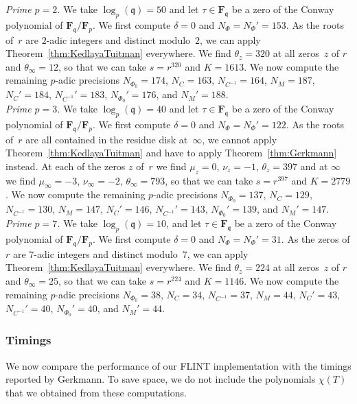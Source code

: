 \documentclass[a4paper,11pt]{article}
\numberwithin{equation}{section}
\newcommand{\FF}{\mathbf{F}} %
\theoremstyle{definition}
\begin{document}
\noindent
\textit{Prime $p=2$.} 
We take $\log_p(\mathfrak{q})=50$ and let $\tau \in \FF_{\mathfrak{q}}$ be 
a zero of the Conway polynomial of $\FF_{\mathfrak{q}}/\FF_p$.  We first 
compute $\delta=0$ and $N_{\Phi}=N_{\Phi}'=153$.  As the roots of~$r$ are 
$2$-adic integers and distinct  modulo~$2$, we can apply 
Theorem~\ref{thm:KedlayaTuitman} everywhere. We find $\theta_z=320$ at all 
zeros~$z$ of $r$ and $\theta_{\infty}=12$, so that we can take $s=r^{320}$ 
and $K=1613$. We now compute the remaining $p$-adic precisions
$N_{\Phi_0}=174$, $N_C=163$, $N_{C^{-1}}=164$, $N_M=187$, 
$N_C'=184$, $N_{C^{-1}}'=183$, $N_{\Phi_0}'=176$, and $N_M'=188$. \\

\noindent 
\textit{Prime $p=3$.}
We take $\log_p(\mathfrak{q})=40$ and let $\tau \in \FF_{\mathfrak{q}}$ be 
a zero of the Conway polynomial of $\FF_{\mathfrak{q}}/\FF_p$.  We first 
compute $\delta=0$ and $N_{\Phi}=N_{\Phi}'=122$. As the roots of~$r$ are all 
contained in the residue disk at~$\infty$, we cannot apply 
Theorem~\ref{thm:KedlayaTuitman} and have to apply Theorem~\ref{thm:Gerkmann} 
instead. At each of the zeros $z$ of~$r$ we find $\mu_z=0$, $\nu_z=-1$, $\theta_z=397$ 
and at $\infty$ we find $\mu_{\infty}=-3$, $\nu_{\infty}=-2$, $\theta_{\infty}=793$, so that 
we can take $s=r^{397}$ and $K=2779$. We now compute the remaining $p$-adic 
precisions
$N_{\Phi_0}=137$, $N_C=129$, $N_{C^{-1}}=130$, $N_M=147$, 
$N_C'=146$, $N_{C^{-1}}'=143$, $N_{\Phi_0}'=139$, and $N_M'=147$. \\

\noindent
\textit{Prime $p=7$.}
We take $\log_p(\mathfrak{q})=10$, and let $\tau \in \FF_{\mathfrak{q}}$ be 
a zero of the Conway polynomial of $\FF_{\mathfrak{q}}/\FF_p$. We first 
compute $\delta=0$ and $N_{\Phi}=N_{\Phi}'=31$.  As the zeros of $r$ are 
$7$-adic integers and distinct modulo~$7$, we can apply 
Theorem~\ref{thm:KedlayaTuitman} everywhere.  We find $\theta_z=224$ at all 
zeros~$z$ of $r$ and $\theta_{\infty}=25$, so that we can take $s=r^{224}$ and
$K=1146$. We now compute the remaining $p$-adic precisions
$N_{\Phi_0}=38$, $N_C=34$, $N_{C^{-1}}=37$, $N_M=44$, 
$N_C'=43$, $N_{C^{-1}}'=40$, $N_{\Phi_0}'=40$, and $N_M'=44$.

\subsubsection{Timings}

We now compare the performance of our FLINT implementation with the 
timings reported by Gerkmann. To save space, we do not include the 
polynomials $\chi(T)$ that we obtained from these computations.
\end{document}
